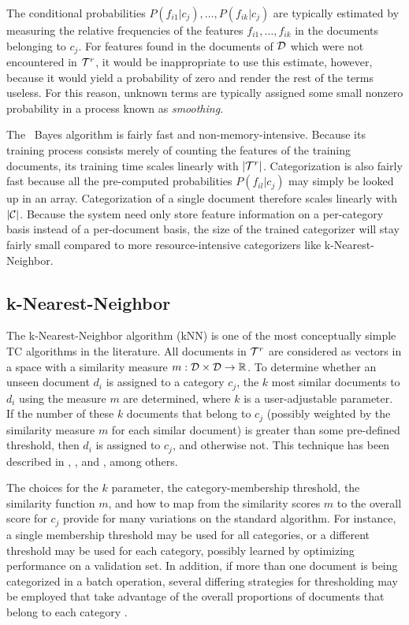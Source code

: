 The conditional probabilities $P(f_{i1}|c_j), \ldots, P(f_{ik}|c_j)$
are typically estimated by measuring the relative frequencies of the
features $f_{i1}, \ldots, f_{ik}$ in the documents belonging to
$c_j$.  For features found in the documents of $\mathcal{D}$ which were not
encountered in $\mathcal{T}^r$, it would be inappropriate to use this
estimate, however, because it would yield a probability of zero and
render the rest of the terms useless.  For this reason, unknown terms
are typically assigned some small nonzero probability in a process
known as \emph{smoothing}.

The \naive\ Bayes algorithm is fairly fast and non-memory-intensive.
Because its training process consists merely of counting the features
of the training documents, its training time scales linearly with
$|\mathcal{T}^r|$.  Categorization is also fairly fast because all the
pre-computed probabilities $P(f_{il}|c_j)$ may simply be looked up in
an array.  Categorization of a single document therefore scales
linearly with $|\mathcal{C}|$.  Because the system need only store feature
information on a per-category basis instead of a per-document basis,
the size of the trained categorizer will stay fairly small compared to
more resource-intensive categorizers like k-Nearest-Neighbor.

\subsection{k-Nearest-Neighbor}
\label{knn}

The k-Nearest-Neighbor algorithm (kNN) is one of the most conceptually
simple TC algorithms in the literature.  All documents in $\mathcal{T}^r$ are
considered as vectors in a space with a similarity measure $m: \mathcal{D}
\times \mathcal{D} \to \mathbb{R}$.  To determine whether an unseen document
$d_i$ is assigned to a category $c_j$, the $k$ most similar documents
to $d_i$ using the measure $m$ are determined, where $k$ is a
user-adjustable parameter.  If the number of these $k$ documents that
belong to $c_j$ (possibly weighted by the similarity measure $m$ for
each similar document) is greater than some pre-defined threshold,
then $d_i$ is assigned to $c_j$, and otherwise not.  This technique
has been described in \cite[p. 28]{sebastiani:02}, \cite{yang:99}, and
\cite{yang:97}, among others.

The choices for the $k$ parameter, the category-membership threshold,
the similarity function $m$, and how to map from the similarity scores
$m$ to the overall score for $c_j$ provide for many variations on the
standard algorithm.  For instance, a single membership threshold may
be used for all categories, or a different threshold may be used for
each category, possibly learned by optimizing performance on a
validation set.  In addition, if more than one document is being
categorized in a batch operation, several differing strategies for
thresholding may be employed that take advantage of the overall
proportions of documents that belong to each category \cite{yang:01}.

